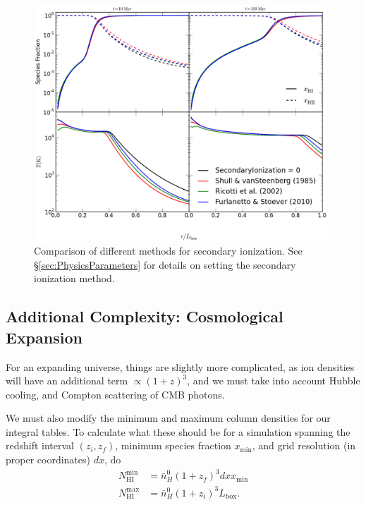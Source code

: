 \documentclass[letterpaper,titlepage,12pt]{article}
\numberwithin{equation}{section}
\newcommand{\HI}{\text{HI}}
\newcommand{\Lbox}{L_{\mathrm{box}}}
\begin{document}
\begin{figure}[htbp!]
\begin{center}
\includegraphics[width=0.98\textwidth]{figures/secondary_ionization_methods.eps}
\caption{Comparison of different methods for secondary ionization.  See \S\ref{sec:PhysicsParameters} for details on setting the secondary ionization method.}
\label{fig:SecondaryIonizationMethods}
\end{center}
\end{figure}

\subsection{Additional Complexity: Cosmological Expansion}
For an expanding universe, things are slightly more complicated, as ion densities will have an additional term $\propto (1 + z)^3$, and we must take into account Hubble cooling, and Compton scattering of CMB photons.

We must also modify the minimum and maximum column densities for our integral tables.  To calculate what these should be for a simulation spanning the redshift interval $(z_i, z_f)$, minimum species fraction $x_{\mathrm{min}}$, and grid resolution (in proper coordinates) $dx$, do
\begin{align}
    N_{\HI}^{\mathrm{min}} & = \bar{n}_H^0 (1 + z_f)^3 dx x_{\mathrm{min}}   \\
    N_{\HI}^{\mathrm{max}} & = \bar{n}_H^0 (1 + z_i)^3 \Lbox .
\end{align}    
\end{document}

